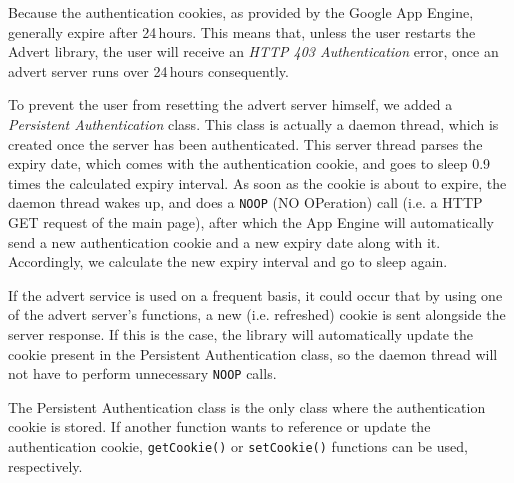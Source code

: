Because the authentication cookies, as provided by the Google App Engine,
generally expire after 24\,hours. This means that, unless the user restarts the
Advert library, the user will receive an \emph{HTTP 403 Authentication} error,
once an advert server runs over 24\,hours consequently. 

To prevent the user from resetting the advert server himself, we added a
\emph{Persistent Authentication} class. This class is actually a daemon thread,
which is created once the server has been authenticated. This server thread
parses the expiry date, which comes with the authentication cookie, and goes to
sleep 0.9 times the calculated expiry interval. As soon as the cookie is about
to expire, the daemon thread wakes up, and does a \texttt{NOOP} (NO OPeration)
call (i.e. a HTTP GET request of the main page), after which the App Engine
will automatically send a new authentication cookie and a new expiry date along
with it. Accordingly, we calculate the new expiry interval and go to sleep
again.

If the advert service is used on a frequent basis, it could occur that by using
one of the advert server's functions, a new (i.e. refreshed) cookie is sent
alongside the server response. If this is the case, the library will
automatically update the cookie present in the Persistent Authentication class,
so the daemon thread will not have to perform unnecessary \texttt{NOOP} calls.

The Persistent Authentication class is the only class where the authentication
cookie is stored. If another function wants to reference or update the
authentication cookie, \texttt{getCookie()} or \texttt{setCookie()} functions
can be used, respectively.
